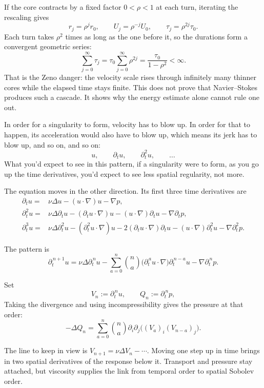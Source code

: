 If the core contracts by a fixed factor \(0<\rho<1\) at each turn, iterating
the rescaling gives
\[
r_j=\rho^jr_0,
\qquad
U_j=\rho^{-j}U_0,
\qquad
\tau_j=\rho^{2j}\tau_0.
\]
Each turn takes \(\rho^2\) times as long as the one before it, so the durations
form a convergent geometric series:
\[
\sum_{j=0}^{\infty}\tau_j
=
\tau_0\sum_{j=0}^{\infty}\rho^{2j}
=
\frac{\tau_0}{1-\rho^2}<\infty.
\]
That is the Zeno danger: the velocity scale rises through infinitely many
thinner cores while the elapsed time stays finite. This does not prove that
Navier--Stokes produces such a cascade. It shows why the energy estimate alone
cannot rule one out.

In order for a singularity to form, velocity has to blow up. In order for
that to happen, its acceleration would also have to blow up, which means its
jerk has to blow up, and so on, and so on:
\[
u,\qquad \partial_tu,\qquad \partial_t^2u,\qquad \ldots
\]
What you'd expect to see in this pattern, if a singularity were to form, as
you go up the time derivatives, you'd expect to see less spatial regularity,
not more.

The equation moves in the other direction. Its first three time derivatives
are
\[
\begin{aligned}
\partial_tu
={}&\nu\Delta u
 -(u\!\cdot\nabla)u
 -\nabla p,\\[3pt]
\partial_t^2u
={}&\nu\Delta\partial_tu
 -(\partial_tu\!\cdot\nabla)u
 -(u\!\cdot\nabla)\partial_tu
 -\nabla\partial_tp,\\[3pt]
\partial_t^3u
={}&\nu\Delta\partial_t^2u
 -(\partial_t^2u\!\cdot\nabla)u
 -2(\partial_tu\!\cdot\nabla)\partial_tu
 -(u\!\cdot\nabla)\partial_t^2u
 -\nabla\partial_t^2p.
\end{aligned}
\]
\begin{samepage}
The pattern is
\[
\partial_t^{\,n+1}u
=\nu\Delta\partial_t^{\,n}u
-\sum_{a=0}^{n}\binom na
  \bigl(\partial_t^{\,a}u\!\cdot\nabla\bigr)
  \partial_t^{\,n-a}u
-\nabla\partial_t^{\,n}p.
\]
\end{samepage}
\begin{samepage}
Set
\[
V_n:=\partial_t^{\,n}u,
\qquad
Q_n:=\partial_t^{\,n}p,
\]
Taking the divergence and using incompressibility gives the pressure at that
order:
\[
-\Delta Q_n
=\sum_{a=0}^{n}\binom na
  \partial_i\partial_j
  \bigl((V_a)_i(V_{n-a})_j\bigr).
\]
\end{samepage}
The line to keep in view is \(V_{n+1}=\nu\Delta V_n-\cdots\). Moving one step
up in time brings in two spatial derivatives of the response below it.
Transport and pressure stay attached, but viscosity supplies the link from
temporal order to spatial Sobolev order.

